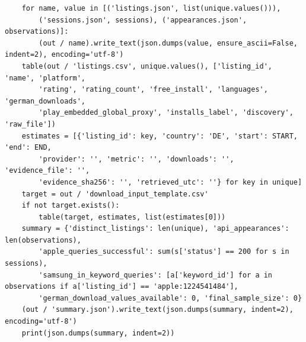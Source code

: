\documentclass[10pt,a4paper]{article}
\begin{document}
\begin{lstlisting}
    for name, value in [('listings.json', list(unique.values())),
        ('sessions.json', sessions), ('appearances.json', observations)]:
        (out / name).write_text(json.dumps(value, ensure_ascii=False, indent=2), encoding='utf-8')
    table(out / 'listings.csv', unique.values(), ['listing_id', 'name', 'platform',
        'rating', 'rating_count', 'free_install', 'languages', 'german_downloads',
        'play_embedded_global_proxy', 'installs_label', 'discovery', 'raw_file'])
    estimates = [{'listing_id': key, 'country': 'DE', 'start': START, 'end': END,
        'provider': '', 'metric': '', 'downloads': '', 'evidence_file': '',
        'evidence_sha256': '', 'retrieved_utc': ''} for key in unique]
    target = out / 'download_input_template.csv'
    if not target.exists():
        table(target, estimates, list(estimates[0]))
    summary = {'distinct_listings': len(unique), 'api_appearances': len(observations),
        'apple_queries_successful': sum(s['status'] == 200 for s in sessions),
        'samsung_in_keyword_queries': [a['keyword_id'] for a in observations if a['listing_id'] == 'apple:1224541484'],
        'german_download_values_available': 0, 'final_sample_size': 0}
    (out / 'summary.json').write_text(json.dumps(summary, indent=2), encoding='utf-8')
    print(json.dumps(summary, indent=2))


\end{lstlisting}
\end{document}
